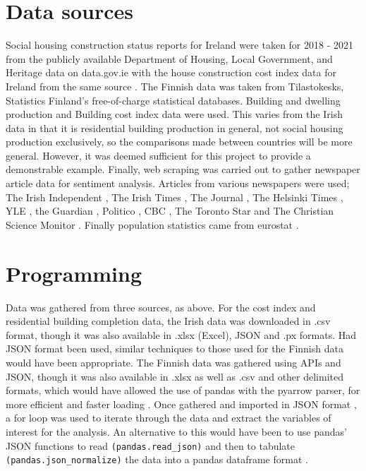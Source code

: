 \documentclass[hidelinks,12pt,oneside]{report} %
\begin{document}
\section{Data sources}
Social housing construction status reports for Ireland were taken for 2018 - 2021 from the publicly available Department of Housing, Local Government, and Heritage data on data.gov.ie \citep{Social} with the house construction cost index data for Ireland from the same source \citep{construction}. The Finnish data was taken from Tilastokesks, Statistics Finland’s free-of-charge statistical databases. Building and dwelling production \citep{12fy} and Building cost index \citep{11na} data were used. This varies from the Irish data in that it is residential building production in general, not social housing production exclusively, so the comparisons made between countries will be more general. However, it was deemed sufficient for this project to provide a demonstrable example. Finally, web scraping was carried out to gather newspaper article data for sentiment analysis. Articles from various newspapers were used; The Irish Independent \citep{TII}, The Irish Times \citep{TIT}, The Journal \citep{TJ}, The Helsinki Times \citep{THT}, YLE \citep{YLE}, the Guardian \citep{TG, TG2}, Politico \citep{P}, CBC \citep{CBC, CBC2}, The Toronto Star \citep{TS} and The Christian Science Monitor \citep{CS}. Finally population statistics came from eurostat \citep{eurostat}.

\section{Programming}
Data was gathered from three sources, as above. For the cost index and residential building completion data, the Irish data was downloaded in .csv format, though it was also available in .xlsx (Excel), JSON and .px formats. Had JSON format been used, similar techniques to those used for the Finnish data would have been appropriate. The Finnish data was gathered using APIs and JSON, though it was also available in .xlsx as well as .csv and other delimited formats, which would have allowed the use of pandas with the pyarrow parser, for more efficient and faster loading \citep{pyarrow}. Once gathered and imported in JSON format \citep{PxWeb}, a for loop was used to iterate through the data and extract the variables of interest for the analysis. An alternative to this would have been to use pandas' JSON functions to read  
\verb|(pandas.read_json)| \citep{read} and then to tabulate \verb|(pandas.json_normalize)| the data into a pandas dataframe format \citep{norm}.
\end{document}
